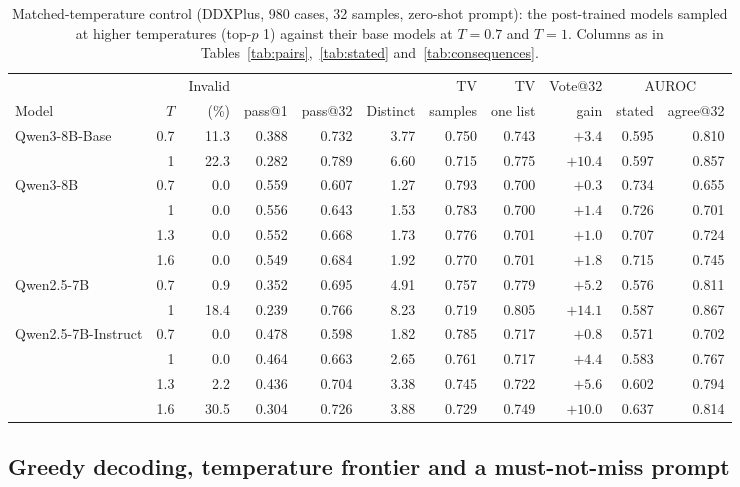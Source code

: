 \documentclass[11pt]{article}
\begin{document}
\begin{table}[t]
\centering\small
\begin{adjustbox}{max width=\linewidth}
\begin{tabular}{lrrrrrrrrrr}
\toprule
 & & Invalid & & & & TV & TV & Vote@32 & \multicolumn{2}{c}{AUROC} \\
Model & $T$ & (\%) & pass@1 & pass@32 & Distinct & samples & one list & gain & stated & agree@32 \\
\midrule
Qwen3-8B-Base & 0.7 & 11.3 & 0.388 & 0.732 & 3.77 & 0.750 & 0.743 & $+3.4$ & 0.595 & 0.810 \\
 & 1 & 22.3 & 0.282 & 0.789 & 6.60 & 0.715 & 0.775 & $+10.4$ & 0.597 & 0.857 \\
Qwen3-8B & 0.7 & 0.0 & 0.559 & 0.607 & 1.27 & 0.793 & 0.700 & $+0.3$ & 0.734 & 0.655 \\
 & 1 & 0.0 & 0.556 & 0.643 & 1.53 & 0.783 & 0.700 & $+1.4$ & 0.726 & 0.701 \\
 & 1.3 & 0.0 & 0.552 & 0.668 & 1.73 & 0.776 & 0.701 & $+1.0$ & 0.707 & 0.724 \\
 & 1.6 & 0.0 & 0.549 & 0.684 & 1.92 & 0.770 & 0.701 & $+1.8$ & 0.715 & 0.745 \\
\midrule
Qwen2.5-7B & 0.7 & 0.9 & 0.352 & 0.695 & 4.91 & 0.757 & 0.779 & $+5.2$ & 0.576 & 0.811 \\
 & 1 & 18.4 & 0.239 & 0.766 & 8.23 & 0.719 & 0.805 & $+14.1$ & 0.587 & 0.867 \\
Qwen2.5-7B-Instruct & 0.7 & 0.0 & 0.478 & 0.598 & 1.82 & 0.785 & 0.717 & $+0.8$ & 0.571 & 0.702 \\
 & 1 & 0.0 & 0.464 & 0.663 & 2.65 & 0.761 & 0.717 & $+4.4$ & 0.583 & 0.767 \\
 & 1.3 & 2.2 & 0.436 & 0.704 & 3.38 & 0.745 & 0.722 & $+5.6$ & 0.602 & 0.794 \\
 & 1.6 & 30.5 & 0.304 & 0.726 & 3.88 & 0.729 & 0.749 & $+10.0$ & 0.637 & 0.814 \\
\bottomrule
\end{tabular}
\end{adjustbox}
\caption{Matched-temperature control (DDXPlus, 980 cases, 32 samples, zero-shot prompt): the post-trained models sampled at higher temperatures (top-$p$ 1) against their base models at $T{=}0.7$ and $T{=}1$. Columns as in Tables~\ref{tab:pairs},~\ref{tab:stated} and~\ref{tab:consequences}.}
\label{tab:matcht}
\end{table}

\subsection{Greedy decoding, temperature frontier and a must-not-miss prompt}\label{sec:decoding}
\end{document}
